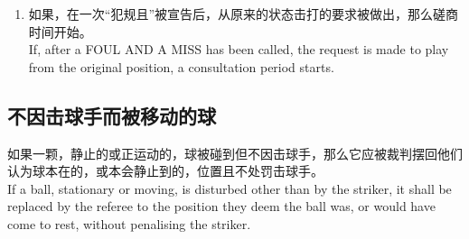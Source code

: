 \begin{enumerate}[label=(\alph*)]
    \begin{enumerate}[label=(\roman*)]
        \item 任何红球，当红球之前是活球时；\\
        any Red, where Red was the ball on;
        \item 成为活球的彩球，当所有红球之前都离开台面时；或\\
        the colour on, where all the Reds were off the table; or
        \item 一颗依击球手选择的彩球，当活球之前是已被击球入袋的一颗红球之后的，或已被击球入袋的一颗被指定当成红球的自由球之后的，一颗彩球时。\\
        a colour of the striker's choice, where the ball on was a colour after a Red, or a free ball nominated as a Red had been potted.
    \end{enumerate}
    如果上面的情况发生在如上面段落\ref{22314d}中所述的“犯规且\miss{}”的宣告序列中，那么任何涉及可能的判定此局他们的对方赢得的警告都应只在所有球都已被摆回违规前它们原来的位置时才仍有效。\\
    If the above situation arises during a sequence of FOUL AND A MISS calls as described under paragraph \ref{22314d} above, any Warning concerning the possible awarding of the frame to their opponent shall only remain in effect when all balls have been replaced to their original position prior to the infringement.
    \item 如果，在一次“犯规且\miss{}”被宣告后，从原来的状态击打的要求被做出，那么磋商时间开始。\\
    If, after a FOUL AND A MISS has been called, the request is made to play from the original position, a consultation period starts.
\end{enumerate}

\subsection{不因击球手而被移动的球}\label{22315}

\noindent 如果一颗，静止的或正运动的，球被碰到但不因击球手，那么它应被裁判摆回他们认为球本在的，或本会静止到的，位置且不处罚击球手。\\
If a ball, stationary or moving, is disturbed other than by the striker, it shall be replaced by the referee to the position they deem the ball was, or would have come to rest, without penalising the striker.

